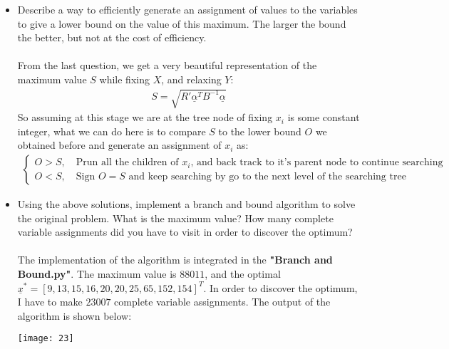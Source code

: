 \documentclass[11pt,letterpaper]{article}
\begin{document}
\bigskip

\begin{tcolorbox}
    \begin{itemize}
        \item Describe a way to efficiently generate an assignment of values to the variables to give a lower bound on the value of this maximum. The larger the bound the better, but not at the cost of efficiency.
        \\\\
        From the last question, we get a very beautiful representation of the maximum value $S$ while fixing $X$, and relaxing $Y$:
        \begin{align*}
            S = \sqrt{R' \underline \alpha^T B^{-1} \underline \alpha}
        \end{align*}
        So assuming at this stage we are at the tree node of fixing $x_i$ is some constant integer, what we can do here is to compare $S$ to the lower bound $O$ we obtained before and generate an assignment of $x_i$ as:
        \begin{align*}
            \begin{cases}
                O > S, \quad \text{Prun all the children of $x_i$, and back track to it's parent node to continue searching} \\
                O < S, \quad \text{Sign $O = S$ and keep searching by go to the next level of the searching tree}
            \end{cases}
        \end{align*}
    \end{itemize}
\end{tcolorbox}

\bigskip

\begin{tcolorbox}
    \begin{itemize}
        \item Using the above solutions, implement a branch and bound algorithm to solve the original problem. What is the maximum value? How many complete variable assignments did you have to visit in order to discover the optimum?
        \\\\
        The implementation of the algorithm is integrated in the \textbf{"Branch and Bound.py"}. The maximum value is $88011$, and the optimal $\underline x^\ast = [9 , 13 , 15 , 16 , 20 , 20 , 25 , 65 ,152, 154]^T$. In order to discover the optimum, I have to make $23007$ complete variable assignments. The output of the algorithm is shown below:
        \begin{center}
            \texttt{[image: 23]}
        \end{center}
    \end{itemize}
\end{tcolorbox}
\end{document}
